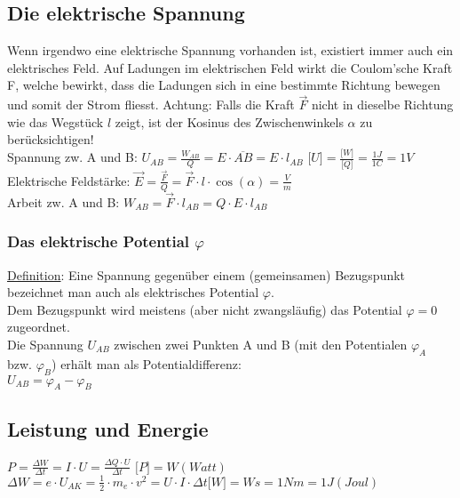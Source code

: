 \subsection{Die elektrische Spannung}
Wenn irgendwo eine elektrische Spannung vorhanden ist, existiert immer auch ein elektrisches Feld. Auf Ladungen im elektrischen Feld wirkt die Coulom'sche Kraft F, welche bewirkt, dass die Ladungen sich in eine bestimmte Richtung bewegen und somit der Strom fliesst. Achtung: Falls die Kraft $\overrightarrow{F}$ nicht in dieselbe Richtung wie das Wegstück $l$ zeigt, ist der Kosinus des Zwischenwinkels $\alpha$ zu berücksichtigen! \\
	Spannung zw. A und B: $U _{AB} = \frac{W _{AB}}{Q}= E \cdot \overline{AB} = E \cdot l_{AB}$ \;
	$ \lbrack U \rbrack = \frac{\lbrack W \rbrack}{\lbrack Q \rbrack} = \frac{1J}{1C}=1V$	\\
	Elektrische Feldstärke: $\overrightarrow{E} = \frac{\overrightarrow{F}}{Q} = \overrightarrow{F} \cdot l \cdot \cos(\alpha) = \frac{V}{m}$\\
	Arbeit zw. A und B: $W_{AB} = \overrightarrow{F} \cdot l_{AB} = Q \cdot E \cdot l_{AB}$

\subsubsection{Das elektrische Potential $ \varphi $}
\underline{Definition}: Eine Spannung gegenüber einem (gemeinsamen) Bezugspunkt bezeichnet man auch als elektrisches Potential $\varphi$.\\
Dem Bezugspunkt wird meistens (aber nicht zwangsläufig) das Potential $\varphi = 0$ zugeordnet.\\
Die Spannung $U_{AB}$ zwischen zwei Punkten A und B (mit den Potentialen $\varphi _{A} $ bzw. $\varphi _{B}$) erhält man als Potentialdifferenz:\\ $ U_{AB}= \varphi _{A} - \varphi _{B}$\\

\subsection{Leistung und Energie}
$ P = \frac{\Delta W}{\Delta t}= I \cdot U = \frac{\Delta Q \cdot U}{\Delta t}$ \hspace{10pt} $\lbrack P \rbrack = W (Watt)$\\
$ \Delta W = e \cdot U_{AK} = \frac{1}{2} \cdot m_{e} \cdot v^2 = U \cdot I \cdot \Delta t$\hspace{10pt}$\lbrack W \rbrack = Ws = 1 Nm = 1J (Joul)$\\
